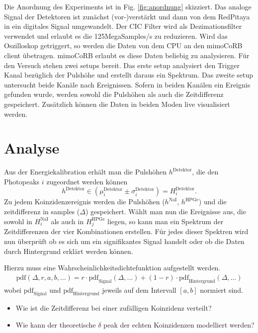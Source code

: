 Die Anordnung des Experiments ist in Fig. \ref{fig:anordnung} skizziert. Das analoge Signal der Detektoren ist zunächst (vor-)verstärkt und dann von dem RedPitaya in ein digitales Signal umgewandelt. Der CIC Filter wird als Dezimationsfilter verwendet und erlaubt es die 125MegaSamples/s zu reduzieren. Wird das Oszilloskop getriggert, so werden die Daten von dem CPU an den mimoCoRB client übetragen. mimoCoRB erlaubt es diese Daten beliebig zu analysieren. Für den Versuch stehen zwei setups bereit. Das erste setup analysiert den Trigger Kanal bezüglich der Pulshöhe und erstellt daraus ein Spektrum. Das zweite setup untersucht beide Kanäle nach Ereignissen. Sofern in beiden Kanälen ein Ereignis gefunden wurde, werden sowohl die Pulshöhen als auch die Zeitdifferenz gespeichert. Zusätzlich können die Daten in beiden Moden live visualisiert werden.




\section{Analyse}

Aus der Energiekalibration erhält man die Pulshöhen $h^\mathrm{Detektor}$, die den Photopeaks $i$ zugeordnet werden können $$h^\mathrm{Detektor}\in\left(\mu^\mathrm{Detektor}_i\pm\sigma^\mathrm{Detektor}_i\right)=H^\mathrm{Detektor}_i.$$
Zu jedem Koinzidenzereignis werden die Pulshöhen ($h^\mathrm{NaI}$, $h^\mathrm{HPGe}$) und die zeitdifferenz in samples ($\Delta$) gespeichert. Wählt man nun die Ereignisse aus, die sowohl in $H^\mathrm{NaI}_i$ als auch in $H^\mathrm{HPGe}_j$ liegen, so kann man ein Spektrum der Zeitdifferenzen der vier Kombinationen erstellen. Für jedes dieser Spektren wird nun überprüft ob es sich um ein signifikantes Signal handelt oder ob die Daten durch Hintergrund erklärt werden können.

Hierzu muss eine Wahrscheinlichkeitsdichtefunktion aufgestellt werden.
\begin{align}
    \mathrm{pdf}(\Delta, r, a,b, \dots)= r\cdot\mathrm{pdf}_\mathrm{Signal}(\Delta,\dots) + (1-r)\cdot\mathrm{pdf}_\mathrm{Hintergrund}(\Delta,\dots)
\end{align}
wobei $\mathrm{pdf}_\mathrm{Signal}$ und $\mathrm{pdf}_\mathrm{Hintergrund}$ jeweils auf dem Intervall $\left[a,b\right]$ normiert sind.

\begin{itemize}
    \item Wie ist die Zeitdifferenz bei einer zufälligen Koinzidenz verteilt?
    \item Wie kann der theoretische $\delta$ peak der echten Koinzidenzen modelliert werden?
\end{itemize}

